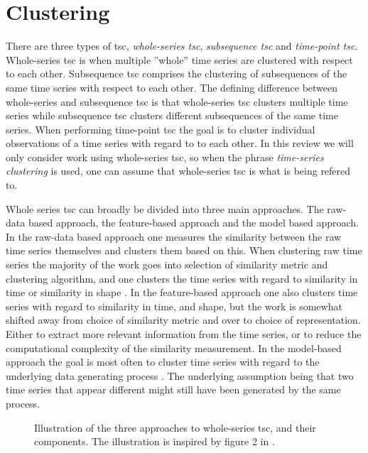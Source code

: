 \section{Clustering} \label{sec:theory_clust}
There are three types of \acrshort{tsc}, \textit{whole-series \acrshort{tsc}}, \textit{subsequence \acrshort{tsc}} and \textit{time-point \acrshort{tsc}}. Whole-series \acrshort{tsc} is when multiple ''whole'' time series are clustered with respect to each other. Subsequence \acrshort{tsc} comprises the clustering of subsequences of the same time series with respect to each other. The defining difference between whole-series and subsequence \acrshort{tsc} is that whole-series \acrshort{tsc} clusters multiple time series while subsequence \acrshort{tsc} clusters different subsequences of the same time series. When performing time-point \acrshort{tsc} the goal is to cluster individual observations of a time series with regard to to each other. In this review we will only consider work using whole-series \acrshort{tsc}, so when the phrase \textit{time-series clustering} is used, one can assume that whole-series \acrshort{tsc} is what is being refered to. \bigskip

Whole series \acrshort{tsc} can broadly be divided into three main approaches. The raw-data based approach, the feature-based approach and the model based approach. In the raw-data based approach one measures the similarity between the raw time series themselves and clusters them based on this. When clustering raw time series the majority of the work goes into selection of similarity metric and clustering algorithm, and one clusters the time series with regard to similarity in time or similarity in shape \cite{tsc_rev}. In the feature-based approach one also clusters time series with regard to similarity in time, and shape, but the work is somewhat shifted away from choice of similarity metric and over to choice of representation. Either to extract more relevant information from the time series, or to reduce the computational complexity of the similarity measurement. In the model-based approach the goal is most often to cluster time series with regard to the underlying data generating process \cite{moar_mpl_tsc}. The underlying assumption being that two time series that appear different might still have been generated by the same process.

\begin{figure}
    \begin{center}
    
    \end{center}
    \caption{Illustration of the three approaches to whole-series \acrshort{tsc}, and their components. The illustration is inspired by figure 2 in \textcite{tsc_rev}.}
    \label{fig:tsc_approaches}
\end{figure}

